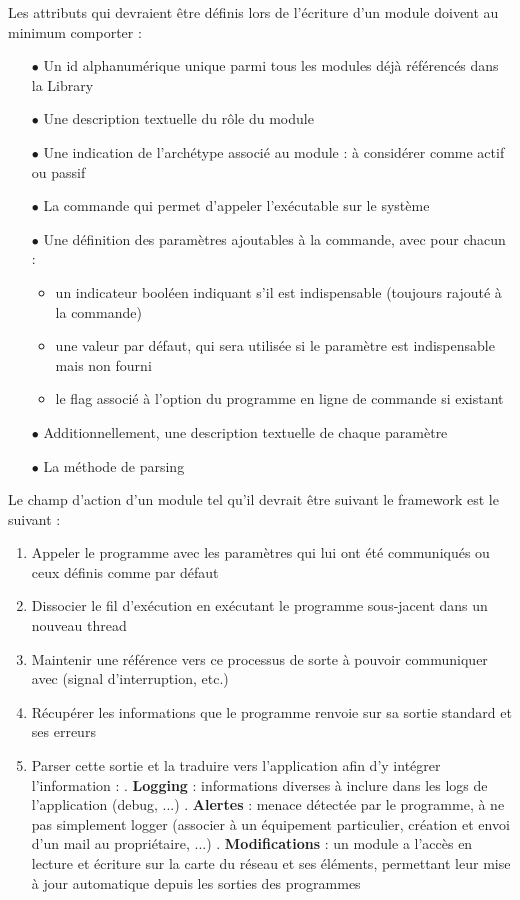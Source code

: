 \documentclass[]{article}
\begin{document}
\newpage

Les attributs qui devraient être définis lors de l'écriture d'un module doivent au minimum comporter : 
\begin{itemize}
\item[$\bullet$] Un id alphanumérique unique parmi tous les modules déjà référencés dans la Library
\item[$\bullet$] Une description textuelle du rôle du module
\item[$\bullet$] Une indication de l'archétype associé au module : à considérer comme actif ou passif
\item[$\bullet$] La commande qui permet d'appeler l'exécutable sur le système
\item[$\bullet$] Une définition des paramètres ajoutables à la commande, avec pour chacun :
\begin{itemize}
\item un indicateur booléen indiquant s'il est indispensable (toujours rajouté à la commande)
\item une valeur par défaut, qui sera utilisée si le paramètre est indispensable mais non fourni
\item le flag associé à l'option du programme en ligne de commande si existant
\end{itemize}
\item[$\bullet$] Additionnellement, une description textuelle de chaque paramètre
\item[$\bullet$] La méthode de parsing
\end{itemize}

\vspace{1.3cm}

Le champ d'action d'un module tel qu'il devrait être suivant le framework est le suivant :

\begin{enumerate}
\item Appeler le programme avec les paramètres qui lui ont été communiqués ou ceux définis comme par défaut
\item Dissocier le fil d'exécution en exécutant le programme sous-jacent dans un nouveau thread
\item Maintenir une référence vers ce processus de sorte à pouvoir communiquer avec (signal d'interruption, etc.)
\item Récupérer les informations que le programme renvoie sur sa sortie standard et ses erreurs
\item Parser cette sortie et la traduire vers l'application afin d'y intégrer l'information :
. \textbf{Logging} : informations diverses à inclure dans les logs de l'application (debug, ...)
. \textbf{Alertes} : menace détectée par le programme, à ne pas simplement logger (associer à un équipement particulier, création et envoi d'un mail au propriétaire, ...)
. \textbf{Modifications} : un module a l'accès en lecture et écriture sur la carte du réseau et ses éléments, permettant leur mise à jour automatique depuis les sorties des programmes
\end{enumerate}
\end{document}
